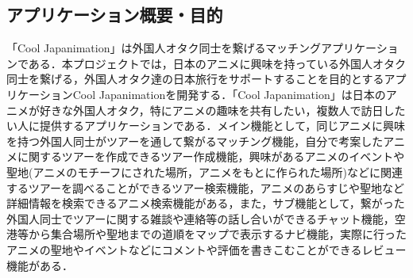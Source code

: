 \subsection{アプリケーション概要・目的}
\par
「Cool Japanimation」は外国人オタク同士を繋げるマッチングアプリケーションである．本プロジェクトでは，日本のアニメに興味を持っている外国人オタク同士を繋げる，外国人オタク達の日本旅行をサポートすることを目的とするアプリケーションCool Japanimationを開発する．「Cool Japanimation」は日本のアニメが好きな外国人オタク，特にアニメの趣味を共有したい，複数人で訪日したい人に提供するアプリケーションである．メイン機能として，同じアニメに興味を持つ外国人同士がツアーを通して繋がるマッチング機能，自分で考案したアニメに関するツアーを作成できるツアー作成機能，興味があるアニメのイベントや聖地(アニメのモチーフにされた場所，アニメをもとに作られた場所)などに関連するツアーを調べることができるツアー検索機能，アニメのあらすじや聖地など詳細情報を検索できるアニメ検索機能がある，また，サブ機能として，繋がった外国人同士でツアーに関する雑談や連絡等の話し合いができるチャット機能，空港等から集合場所や聖地までの道順をマップで表示するナビ機能，実際に行ったアニメの聖地やイベントなどにコメントや評価を書きこむことができるレビュー機能がある．
